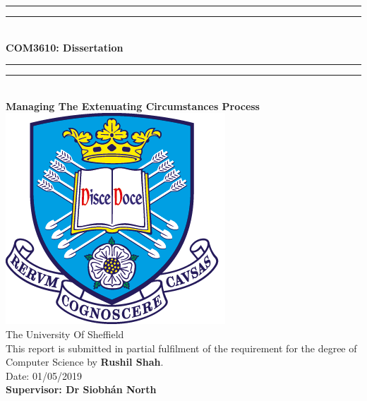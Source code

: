 \documentclass[../main.tex]{subfiles}
\begin{document}
\begin{center}
\rule[0.5ex]{\linewidth}{2pt}\vspace*{-\baselineskip}\vspace*{3.2pt}
\rule[0.5ex]{\linewidth}{1pt}\\[\baselineskip]

\textbf{ {\LARGE COM3610: Dissertation}}\\[2mm]

\rule[0.5ex]{\linewidth}{1pt}\vspace*{-\baselineskip}\vspace{3.2pt}
\rule[0.5ex]{\linewidth}{2pt}\\[4mm]

\textbf{{\large Managing The Extenuating Circumstances Process}}\\[20mm]


\includegraphics[scale=2]{images/TuosLogo.png}\\[12mm]

{\LARGE The University Of Sheffield}\\[2mm]
This report is submitted in partial fulfilment of the requirement for the degree of Computer Science by \textbf{Rushil Shah}.\\[2mm]

Date: 01/05/2019\\[20mm]
{\large \textbf{Supervisor: Dr Siobhán North}}

\end{center}





%
%
%
\end{document}
